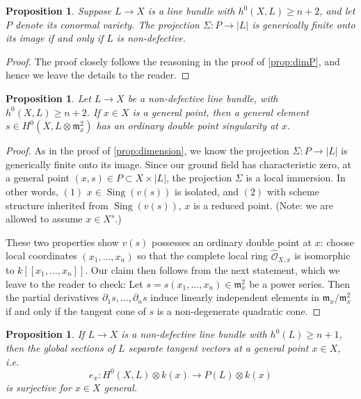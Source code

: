 \documentclass[11pt,reqno]{amsart}
\theoremstyle{plain}
\newtheorem{proposition}[theorem]{Proposition}
\theoremstyle{definition}
\theoremstyle{remark}
\numberwithin{equation}{section}
\DeclareMathOperator{\sing}{Sing}
\newcommand{\cO}{{\mathcal O}}
\renewcommand{\to}{{\longrightarrow}}
\numberwithin{equation}{section}
\begin{document}
\begin{proposition}
  \label{prop:dimensionCriterion}
  Suppose $L \to X$ is a line bundle with $h^{0}(X,L) \geq n+2$, and let $P$ denote its conormal variety.  The projection $\Sigma: P \to |L|$ is generically finite onto its image if and only if $L$ is non-defective. 
\end{proposition}

\begin{proof}
  The proof closely follows the reasoning in the proof of \autoref{prop:dimP}, and hence we leave the details to the reader.
\end{proof}

\begin{proposition}\label{prop:ordinarydoublepoint}
  Let $L \to X$ be a non-defective line bundle, with $h^{0}(X,L) \geq n+2$. If $x \in X$ is a general point, then a general element $s \in H^{0}(X,L \otimes {\mathfrak{m}}^{2}_{x})$ has an ordinary double point singularity at $x$.
\end{proposition}

\begin{proof}
  As in the proof of \autoref{prop:dimension}, we know  the projection $\Sigma: P \to
  |L|$ is generically finite onto its image. Since our ground field has characteristic
  zero, at a general point $(x,s) \in P \subset X \times |L|$, the projection $\Sigma$ is a local immersion.  In other words, $(1)$  $x \in \sing(v(s))$ is isolated, and $(2)$ with scheme structure inherited from $\sing(v(s))$, $x$ is a reduced point. (Note: we are allowed to assume $x \in X^{s}$.)  

  These two properties show $v(s)$ possesses an ordinary double point at $x$: choose local coordinates $(x_{1}, ..., x_{n})$ so that the complete local ring ${\widehat{\cO}_{X,x}}$ is isomorphic to $k[[x_{1}, ..., x_{n}]]$. Our claim then follows from the next statement, which we leave to the reader to check: Let $s = s(x_{1}, ..., x_{n}) \in {\mathfrak m}^{2}_{x}$ be a power series. Then the partial derivatives $\partial_{1}s, ..., \partial_{n}s$ induce linearly independent elements in ${\mathfrak m}_{x}/{\mathfrak m}^{2}_{x}$ if and only if the tangent cone of $s$ is a non-degenerate quadratic cone.
\end{proof}



\begin{proposition}
  \label{prop:genericSeparateTangents}
  If $L \to X$ is a non-defective line bundle  with $h^{0}(L) \geq n+1$, then the global sections of $L$ separate tangent vectors at a general point $x \in X$, i.e. $$e_{x}: H^{0}(X,L) \otimes k(x) \to P(L) \otimes k(x)$$ is surjective for $x \in X$ general.
\end{proposition}
\end{document}
